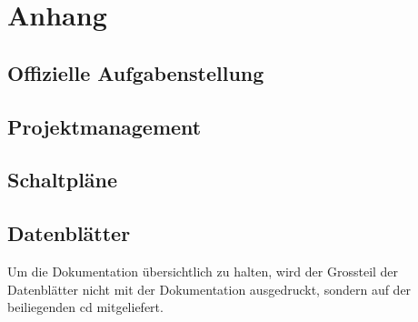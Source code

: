 %
%



\appendix
\chapter{Anhang}\label{chap.anhang}


\section{Offizielle Aufgabenstellung}\label{app.aufgabenstellung}



\section{Projektmanagement}\label{app.projektmanagement}





\section{Schaltpläne}\label{app.pcb}




\section{Datenblätter}\label{app.datasheets}
Um die Dokumentation übersichtlich zu halten, wird der Grossteil der Datenblätter nicht mit der Dokumentation ausgedruckt, sondern auf der beiliegenden \gls{cd} mitgeliefert.


